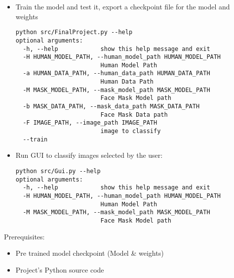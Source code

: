 \begin{itemize}
\item Train the model and test it, export a checkpoint file for the model and weights
\begin{verbatim}
python src/FinalProject.py --help
optional arguments:
  -h, --help            show this help message and exit
  -H HUMAN_MODEL_PATH, --human_model_path HUMAN_MODEL_PATH
                        Human Model Path
  -a HUMAN_DATA_PATH, --human_data_path HUMAN_DATA_PATH
                        Human Data Path
  -M MASK_MODEL_PATH, --mask_model_path MASK_MODEL_PATH
                        Face Mask Model path
  -b MASK_DATA_PATH, --mask_data_path MASK_DATA_PATH
                        Face Mask Data path
  -F IMAGE_PATH, --image_path IMAGE_PATH
                        image to classify
  --train

\end{verbatim}

\item{Run GUI to classify images selected by the user:}
\begin{verbatim}
python src/Gui.py --help
optional arguments:
  -h, --help            show this help message and exit
  -H HUMAN_MODEL_PATH, --human_model_path HUMAN_MODEL_PATH
                        Human Model Path
  -M MASK_MODEL_PATH, --mask_model_path MASK_MODEL_PATH
                        Face Mask Model path

\end{verbatim}
\end{itemize}

Prerequisites:
\begin{itemize}
    \item Pre trained model checkpoint (Model \& weights)
    \item Project's Python source code
\end{itemize}
